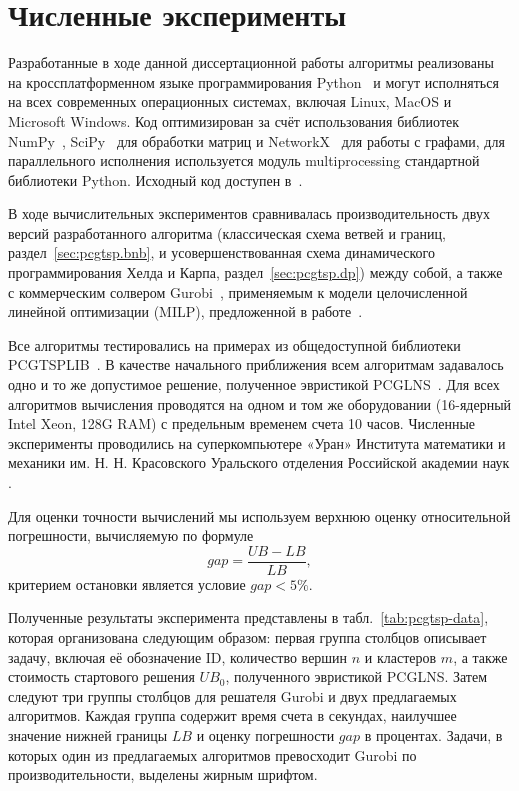 
\section{Численные эксперименты}
\label{sec:pcgtsp.exp}

Разработанные в ходе данной диссертационной работы алгоритмы
реализованы на кроссплатформенном языке программирования Python~\cite{bi:Python}
и могут исполняться на всех современных операционных системах,
включая Linux, MacOS и Microsoft Windows.
Код оптимизирован за счёт использования библиотек
NumPy~\cite{bi:NumPy},
SciPy~\cite{bi:SciPy}
для обработки матриц и NetworkX~\cite{bi:NetworkX}
для работы с графами,
для параллельного исполнения используется модуль multiprocessing стандартной библиотеки Python.
Исходный код доступен в~\cite{bi:pcgtsp-bnb}.

В ходе вычислительных экспериментов
сравнивалась производительность
двух версий разработанного алгоритма
(классическая схема ветвей и границ,
раздел~\ref{sec:pcgtsp.bnb},
и усовершенствованная схема динамического программирования
Хелда и Карпа,
раздел~\ref{sec:pcgtsp.dp})
между собой,
а также с коммерческим солвером Gurobi~\cite{bi:Gurobi},
применяемым к модели целочисленной линейной оптимизации (MILP),
предложенной в работе~\cite{KKP-optima2020}.

Все алгоритмы тестировались на примерах из
общедоступной библиотеки PCGTSPLIB~\cite{SALMAN2020163}.
В качестве начального приближения всем алгоритмам задавалось одно и то же допустимое решение,
полученное эвристикой PCGLNS~\cite{bi:PCGLNS}.
Для всех алгоритмов вычисления проводятся на одном и том же оборудовании
(16-ядерный Intel Xeon, 128G RAM)
с предельным временем счета 10 часов.
Численные эксперименты проводились на суперкомпьютере «Уран»
Института математики и механики им. Н. Н. Красовского Уральского отделения Российской академии наук
\cite{bi:URAN}.

Для оценки точности вычислений мы используем верхнюю оценку относительной погрешности,
вычисляемую по формуле
\begin{equation}
  \label{eq:gtsp.gap}
  gap = \frac{UB - LB}{LB},
\end{equation}
критерием остановки является условие
$gap < 5\%$.

Полученные результаты эксперимента
представлены в табл.~\ref{tab:pcgtsp-data},
которая организована следующим образом:
первая группа столбцов описывает
задачу,
включая её обозначение ID,
количество вершин $n$
и кластеров $m$,
а также стоимость стартового решения $UB_0$,
полученного эвристикой PCGLNS.
Затем следуют три группы столбцов
для решателя Gurobi
и двух предлагаемых алгоритмов.
Каждая группа содержит время
счета в секундах,
наилучшее значение нижней границы
$LB$
и оценку погрешности $gap$
в процентах.
Задачи,
в которых один из предлагаемых
алгоритмов превосходит Gurobi по производительности,
выделены жирным шрифтом.

